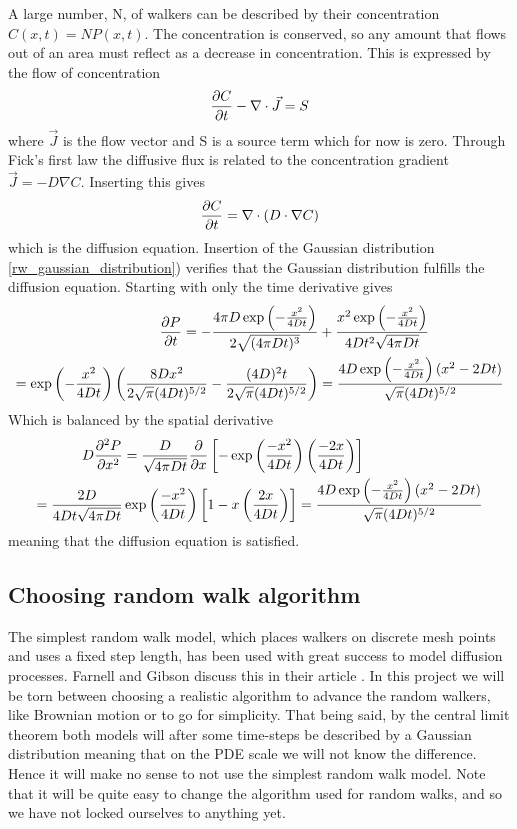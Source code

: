 A large number, N, of walkers can be described by their concentration $C(x,t) = NP(x,t)$.
The concentration is conserved, so any amount that flows out of an area must reflect as a decrease in concentration. 
This is expressed by the flow of concentration
\begin{equation}
 \frac{\partial C}{\partial t} -\nabla\cdot\vec{J} = S
\end{equation}
where $\vec{J}$ is the flow vector and S is a source term which for now is zero.
Through Fick's first law the diffusive flux is related to the concentration gradient $\vec{J} = -D\nabla C$. 
Inserting this gives
\begin{equation}\label{simple_diffusion_equation}
 \frac{\partial C}{\partial t} = \nabla\cdot \left(D\cdot\nabla C\right)
\end{equation}
which is the diffusion equation.
Insertion of the Gaussian distribution \eqref{rw_gaussian_distribution}) verifies that the Gaussian distribution fulfills the diffusion equation. 
Starting with only the time derivative gives
\begin{align*}
 \frac{\partial P}{\partial t} = -\frac{4\pi D\exp\left(-\frac{x^2}{4Dt}\right)}{2\sqrt{(4\pi Dt)^3}}&+\frac{x^2\exp\left(-\frac{x^2}{4Dt}\right)}{4Dt^2\sqrt{4\pi Dt}} \\
 = \exp\left(-\frac{x^2}{4Dt}\right)\left(\frac{8Dx^2}{2\sqrt{\pi}(4Dt)^{5/2}} -\frac{(4D)^2t}{2\sqrt{\pi}(4Dt)^{5/2}}\right)&= \frac{4D\exp\left(-\frac{x^2}{4Dt}\right)(x^2-2Dt)}{\sqrt{\pi}(4Dt)^{5/2}}
\end{align*}
 Which is balanced by the spatial derivative
\begin{align*}
 D\frac{\partial^2 P}{\partial x^2} &= \frac{D}{\sqrt{4\pi Dt}}\frac{\partial}{\partial x}\left[-\exp\left(\frac{-x^2}{4Dt}\right)\left(\frac{-2x}{4Dt}\right)\right]\\
 = \frac{2D}{4Dt\sqrt{4\pi Dt}}&\exp\left(\frac{-x^2}{4Dt}\right)\left[1-x\left(\frac{2x}{4Dt}\right)\right] = \frac{4D\exp\left(-\frac{x^2}{4Dt}\right)(x^2-2Dt)}{\sqrt{\pi}(4Dt)^{5/2}}
\end{align*}
meaning that the diffusion equation is satisfied.

\subsection{Choosing random walk algorithm}\label{choosing_random_walk_algorithm}

The simplest random walk model, which places walkers on discrete mesh points and uses a fixed step length, has been used with great success to model diffusion processes. 
Farnell and Gibson discuss this in their article \cite{farnell2005monte}. 
In this project we will be torn between choosing a realistic algorithm to advance the random walkers, like Brownian motion or to go for simplicity. 
That being said, by the central limit theorem both models will after some time-steps be described by a Gaussian distribution meaning that on the PDE scale we will not know the difference. 
Hence it will make no sense to not use the simplest random walk model.
Note that it will be quite easy to change the algorithm used for random walks, and so we have not locked ourselves to anything yet.

